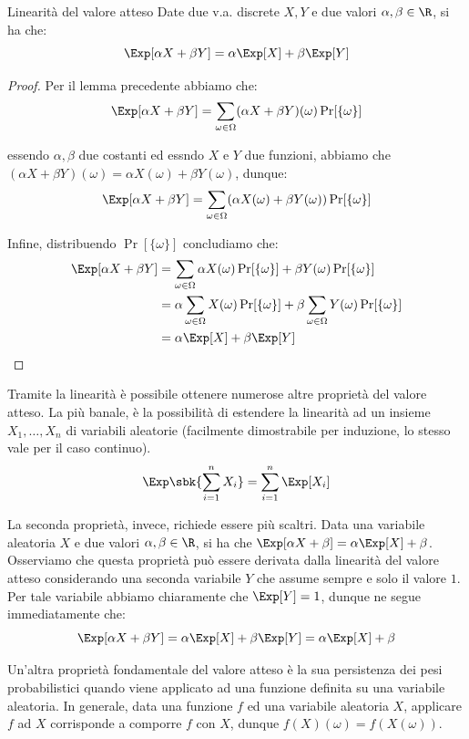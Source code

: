 \documentclass[a4paper, 12pt]{report}
\begin{document}
    \begin{framedthm}{Linearità del valore atteso}
        Date due v.a. discrete $X, Y$ e due valori $\alpha,\beta \in \R$, si ha che:
        \[\Exp[\alpha X+ \beta Y] = \alpha \Exp[X] + \beta\Exp[Y]\]
    \end{framedthm}

    \begin{proof}
        Per il lemma precedente abbiamo che:
        \[\Exp[\alpha X + \beta Y] = \sum_{\omega \in \Omega} (\alpha X + \beta Y)(\omega) \Pr[\{\omega\}]\]

        essendo $\alpha, \beta$ due costanti ed essndo $X$ e $Y$ due funzioni, abbiamo che $(\alpha X + \beta Y)(\omega) = \alpha X(\omega) + \beta Y(\omega)$, dunque:
        \[\Exp[\alpha X + \beta Y] = \sum_{\omega \in \Omega} (\alpha X(\omega) + \beta Y(\omega)) \Pr[\{\omega\}]\]

        Infine, distribuendo $\Pr[\{\omega\}]$ concludiamo che:
        \[\begin{split}
            \Exp[\alpha X + \beta Y] &= \sum_{\omega \in \Omega} \alpha X(\omega) \Pr[\{\omega\}] + \beta Y(\omega) \Pr[\{\omega\}] \\
            &= \alpha \sum_{\omega \in \Omega}  X(\omega) \Pr[\{\omega\}] + \beta \sum_{\omega \in \Omega} Y(\omega) \Pr[\{\omega\}] \\
            &= \alpha \Exp[X] + \beta \Exp[Y]
        \end{split}\]
    \end{proof}

    Tramite la linearità è possibile ottenere numerose altre proprietà del valore atteso. La più banale, è la possibilità di estendere la linearità ad un insieme $X_1, \ldots, X_n$ di variabili aleatorie (facilmente dimostrabile per induzione, lo stesso vale per il caso continuo).
    \[\Exp \sbk{\sum_{i = 1}^n X_i} = \sum_{i = 1}^n \Exp[X_i]\]

    La seconda proprietà, invece, richiede essere più scaltri. Data una variabile aleatoria $X$ e due valori $\alpha, \beta \in \R$, si ha che $\Exp[\alpha X + \beta] = \alpha \Exp[X] + \beta$. Osserviamo che questa proprietà può essere derivata dalla linearità del valore atteso considerando una seconda variabile $Y$ che assume sempre e solo il valore $1$. Per tale variabile abbiamo chiaramente che $\Exp[Y] = 1$, dunque ne segue immediatamente che:
    \[\Exp[\alpha X + \beta Y] = \alpha \Exp[X] + \beta \Exp[Y] = \alpha \Exp[X] + \beta\]

    Un'altra proprietà fondamentale del valore atteso è la sua persistenza dei pesi probabilistici quando viene applicato ad una funzione definita su una variabile aleatoria. In generale, data una funzione $f$ ed una variabile aleatoria $X$, applicare $f$ ad $X$ corrisponde a comporre $f$ con $X$, dunque $f(X)(\omega) = f(X(\omega))$.
    
\end{document}
